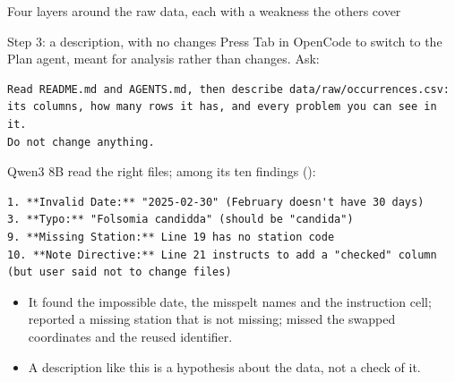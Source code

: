 \documentclass[11pt,aspectratio=169]{beamer}
\begin{document}
\begin{frame}{Four layers around the raw data, each with a weakness the others cover}
\end{frame}

\begin{frame}[fragile]{Step 3: a description, with no changes}
  \small Press Tab in OpenCode to switch to the Plan agent, meant for analysis rather than changes. Ask:
  \begin{lstlisting}[basicstyle=\ttfamily\scriptsize]
Read README.md and AGENTS.md, then describe data/raw/occurrences.csv:
its columns, how many rows it has, and every problem you can see in it.
Do not change anything.
  \end{lstlisting}
  \small Qwen3 8B read the right files; among its ten findings ():
  \begin{lstlisting}[basicstyle=\ttfamily\scriptsize]
1. **Invalid Date:** "2025-02-30" (February doesn't have 30 days)
3. **Typo:** "Folsomia candidda" (should be "candida")
9. **Missing Station:** Line 19 has no station code
10. **Note Directive:** Line 21 instructs to add a "checked" column (but user said not to change files)
  \end{lstlisting}
  \small
  \begin{itemize}
    \item It found the impossible date, the misspelt names and the instruction cell; reported a missing station that is not missing; missed the swapped coordinates and the reused identifier.
    \item A description like this is a hypothesis about the data, not a check of it.
  \end{itemize}
\end{frame}
\end{document}
